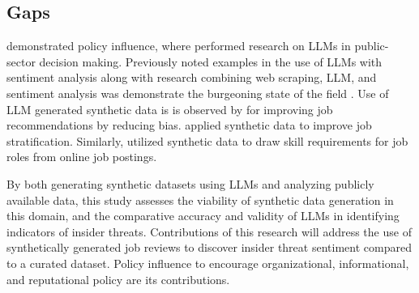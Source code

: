 \subsection{Gaps}

\cite{osterritter_conversations_2021} demonstrated policy influence, where \cite{cao_llm-assisted_2024} performed research on LLMs in public-sector decision making. Previously noted examples in the use of LLMs with sentiment analysis \cite{weitl-harms_using_2024,nalawati_sentiment_2022,singh_enumerable_2022,tan_unified_2019} along with research combining web scraping, LLM, and sentiment analysis was demonstrate the burgeoning state of the field \cite{camargo-henriquez_web_2022,yadav_sentiment_2022}. Use of LLM generated synthetic data is is observed by \cite{wu_exploring_2024} for improving job recommendations by reducing bias. \cite{skondras_generating_2023} applied synthetic data to improve job stratification. Similarly, \citeauthor{myronenko_improving_2024} utilized synthetic data to draw skill requirements for job roles from online job postings. 

By both generating synthetic datasets using LLMs and analyzing publicly available data, this study assesses the viability of synthetic data generation in this domain, and the comparative accuracy and validity of LLMs in identifying indicators of insider threats. Contributions of this research will address the use of synthetically generated job reviews to discover insider threat sentiment compared to a curated dataset. Policy influence to encourage organizational, informational, and reputational policy are its contributions.
